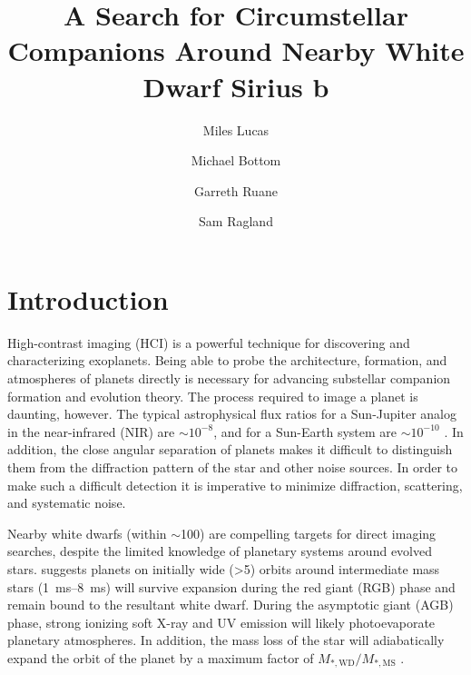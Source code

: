 \documentclass[twocolumn]{aastex631}
\begin{document}
\title{A Search for Circumstellar Companions Around Nearby White Dwarf Sirius b}



\author[0000-0001-6341-310X]{Miles Lucas}

\author[0000-0003-1341-5531]{Michael Bottom}

\author[0000-0003-4769-1665]{Garreth Ruane}

\author[0000-0002-0696-1780]{Sam Ragland}


\begin{abstract}

\end{abstract}

\section{Introduction} \label{sec:intro}

High-contrast imaging (HCI) is a powerful technique for discovering and characterizing exoplanets. Being able to probe the architecture, formation, and atmospheres of planets directly is necessary for advancing substellar companion formation and evolution theory. The process required to image a planet is daunting, however. The typical astrophysical flux ratios for a Sun-Jupiter analog in the near-infrared (NIR) are $\sim10^{-8}$, and for a Sun-Earth system are $\sim10^{-10}$ \citep{traub_direct_2010}. In addition, the close angular separation of planets makes it difficult to distinguish them from the diffraction pattern of the star and other noise sources. In order to make such a difficult detection it is imperative to minimize diffraction, scattering, and systematic noise.

Nearby white dwarfs (within $\sim$\qty{100}{\parsec}) are compelling targets for direct imaging searches, despite the limited knowledge of planetary systems around evolved stars. \cite{burleigh_imaging_2002} suggests planets on initially wide (>\qty{5}{\au}) orbits around intermediate mass stars (\qtyrange{1}{8}{\ms}) will survive expansion during the red giant (RGB) phase and remain bound to the resultant white dwarf. During the asymptotic giant (AGB) phase, strong ionizing soft X-ray and UV emission will likely photoevaporate planetary atmospheres. In addition,  the mass loss of the star will adiabatically expand the orbit of the planet by a maximum factor of $M_{*,\mathrm{WD}}/M_{*,\mathrm{MS}}$ \citep{jeans_cosmogonic_1924}.
\end{document}

